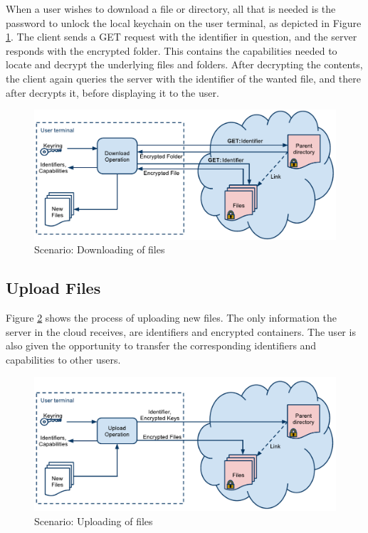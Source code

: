 \documentclass[pdftex,english,10pt,b5paper,twoside]{book}
\begin{document}
When a user wishes to download a file or directory, all that is needed is the
password to unlock the local keychain on the user terminal, as depicted in Figure
\ref{fig:AS:download}. The client sends a GET request with the identifier in
question, and the server responds with the encrypted folder. This contains the
capabilities needed to locate and decrypt the underlying files and folders.
After decrypting the contents, the client again queries the server with the
identifier of the wanted file, and there after decrypts it, before displaying it
to the user.

\begin{figure}[h!]
    \centering
    \includegraphics[width=\columnwidth]{ArchitectureDownload.pdf}
    \caption{Scenario: Downloading of files}
    \label{fig:AS:download}
\end{figure}

\subsection{Upload Files}

Figure \ref{fig:AS:upload} shows the process of uploading new files. The only
information the server in the cloud receives, are identifiers and encrypted
containers. The user is also given the opportunity to transfer the corresponding
identifiers and capabilities to other users.

\begin{figure}[h!]
    \centering
    \includegraphics[width=\columnwidth]{ArchitectureUpload.pdf}
    \caption{Scenario: Uploading of files}
    \label{fig:AS:upload}
\end{figure}
\end{document}
